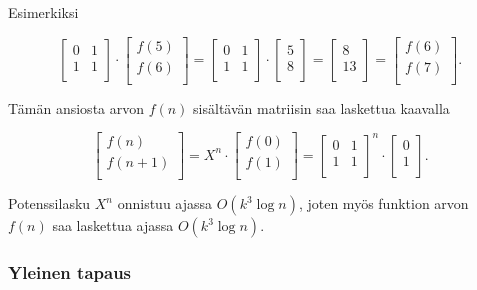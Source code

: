 Esimerkiksi

\[
 \begin{bmatrix}
  0 & 1 \\
  1 & 1 \\
 \end{bmatrix}
\cdot
 \begin{bmatrix}
  f(5) \\
  f(6) \\
 \end{bmatrix}
=
 \begin{bmatrix}
  0 & 1 \\
  1 & 1 \\
 \end{bmatrix}
\cdot
 \begin{bmatrix}
  5 \\
  8 \\
 \end{bmatrix}
=
 \begin{bmatrix}
  8 \\
  13 \\
 \end{bmatrix}
=
 \begin{bmatrix}
  f(6) \\
  f(7) \\
 \end{bmatrix}.
\]

Tämän ansiosta arvon $f(n)$ sisältävän matriisin saa laskettua
kaavalla

\[
 \begin{bmatrix}
  f(n) \\
  f(n+1) \\
 \end{bmatrix}
=
X^n \cdot
 \begin{bmatrix}
  f(0) \\
  f(1) \\
 \end{bmatrix}
=
 \begin{bmatrix}
  0 & 1 \\
  1 & 1 \\
 \end{bmatrix}^n
\cdot
 \begin{bmatrix}
  0 \\
  1 \\
 \end{bmatrix}.
\]

Potenssilasku $X^n$ onnistuu ajassa
$O(k^3 \log n)$,
joten myös funktion arvon $f(n)$
saa laskettua ajassa $O(k^3 \log n)$.

\subsubsection{Yleinen tapaus}

